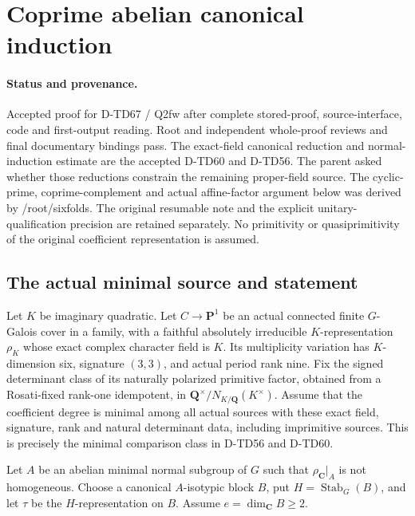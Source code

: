 \section{Coprime abelian canonical induction}
\label{sec:SF-coprime-abelian-canonical}

\paragraph{Status and provenance.}
Accepted proof for D-TD67 / Q2fw after complete stored-proof,
source-interface, code and first-output reading. Root and independent
whole-proof reviews and final documentary bindings pass. The exact-field canonical reduction
and normal-induction estimate are the accepted D-TD60 and D-TD56.
The parent asked whether those reductions constrain the remaining
proper-field source. The cyclic-prime, coprime-complement and actual
affine-factor argument below was derived by /root/sixfolds.
The original resumable note and the explicit unitary-qualification
precision are retained separately. No primitivity or quasiprimitivity
of the original coefficient representation is assumed.

\subsection*{The actual minimal source and statement}

Let \(K\) be imaginary quadratic. Let \(C\to\mathbf P^1\) be an actual
connected finite \(G\)-Galois cover in a family, with a faithful
absolutely irreducible \(K\)-representation \(\rho_K\) whose exact
complex character field is \(K\). Its multiplicity variation has
\(K\)-dimension six, signature \((3,3)\), and actual period rank nine.
Fix the signed determinant class of its naturally polarized primitive
factor, obtained from a Rosati-fixed rank-one idempotent, in
\(\mathbf Q^\times/N_{K/\mathbf Q}(K^\times)\).
Assume that the coefficient degree is minimal among all actual
sources with these exact field, signature, rank and natural determinant
data, including imprimitive sources. This is precisely the minimal
comparison class in D-TD56 and D-TD60.

Let \(A\) be an abelian minimal normal subgroup of \(G\) such that
\(\rho_{\mathbf C}|_A\) is not homogeneous. Choose a canonical
\(A\)-isotypic block \(B\), put \(H=\operatorname{Stab}_G(B)\),
and let \(\tau\) be the \(H\)-representation on \(B\). Assume
\(e=\dim_{\mathbf C}B\ge2\).


